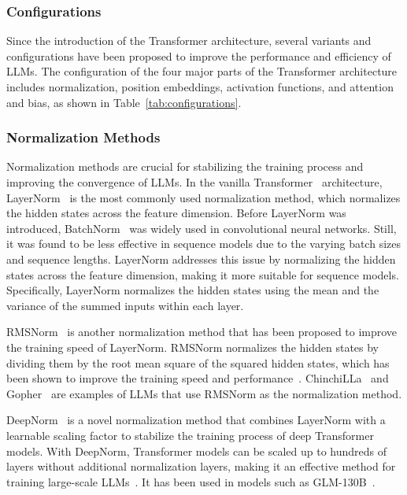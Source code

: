 \subsubsection{Configurations}
\label{subsubsec:configurations}

Since the introduction of the Transformer architecture, several variants and configurations have been proposed to improve the performance and efficiency of LLMs.
The configuration of the four major parts of the Transformer architecture includes normalization, position embeddings, activation functions, and attention and bias, as shown in Table~\ref{tab:configurations}.

\subsubsection{Normalization Methods}
\label{subsubsec:normalization}
Normalization methods are crucial for stabilizing the training process and improving the convergence of LLMs.
In the vanilla Transformer~\cite{vaswani2023attention} architecture, LayerNorm~\cite{ba2016layer} is the most commonly used normalization method, which normalizes the hidden states across the feature dimension.
Before LayerNorm was introduced, BatchNorm~\cite{ioffe2015batch} was widely used in convolutional neural networks.
Still, it was found to be less effective in sequence models due to the varying batch sizes and sequence lengths.
LayerNorm addresses this issue by normalizing the hidden states across the feature dimension, making it more suitable for sequence models.
Specifically, LayerNorm normalizes the hidden states using the mean and the variance of the summed inputs within each layer.

RMSNorm~\cite{zhang2019root} is another normalization method that has been proposed to improve the training speed of LayerNorm.
RMSNorm normalizes the hidden states by dividing them by the root mean square of the squared hidden states, which has been shown to improve the training speed and performance~\cite{narang2021transformer}.
ChinchiLLa~\cite{hoffmann2022training} and Gopher~\cite{rae2021scaling} are examples of LLMs that use RMSNorm as the normalization method.

DeepNorm~\cite{wang2022deepnet} is a novel normalization method that combines LayerNorm with a learnable scaling factor to stabilize the training process of deep Transformer models.
With DeepNorm, Transformer models can be scaled up to hundreds of layers without additional normalization layers, making it an effective method for training large-scale LLMs~\cite{wang2022deepnet}.
It has been used in models such as GLM-130B~\cite{zeng2022glm130b}.

